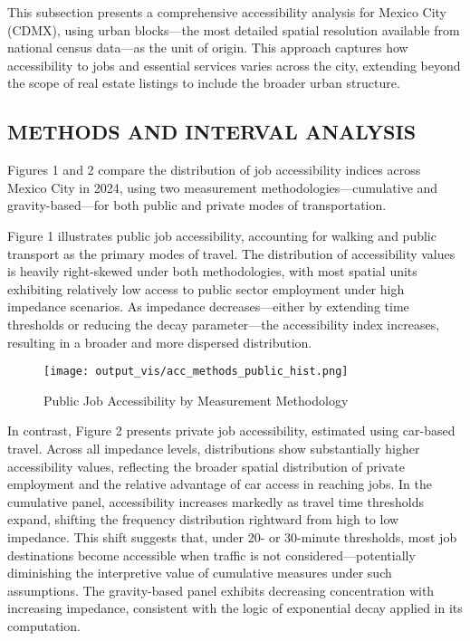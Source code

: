 \documentclass[
  12pt,
]{report}
\begin{document}
This subsection presents a comprehensive accessibility analysis for
Mexico City (CDMX), using urban blocks---the most detailed spatial
resolution available from national census data---as the unit of origin.
This approach captures how accessibility to jobs and essential services
varies across the city, extending beyond the scope of real estate
listings to include the broader urban structure.

\subsection{METHODS AND INTERVAL
ANALYSIS}\label{methods-and-interval-analysis}

Figures 1 and 2 compare the distribution of job accessibility indices
across Mexico City in 2024, using two measurement
methodologies---cumulative and gravity-based---for both public and
private modes of transportation.

Figure 1 illustrates public job accessibility, accounting for walking
and public transport as the primary modes of travel. The distribution of
accessibility values is heavily right-skewed under both methodologies,
with most spatial units exhibiting relatively low access to public
sector employment under high impedance scenarios. As impedance
decreases---either by extending time thresholds or reducing the decay
parameter---the accessibility index increases, resulting in a broader
and more dispersed distribution.

\begin{figure}[H]

{\centering \texttt{[image: output\_vis/acc\_methods\_public\_hist.png]}

}

\caption{Public Job Accessibility by Measurement Methodology}

\end{figure}%

In contrast, Figure 2 presents private job accessibility, estimated
using car-based travel. Across all impedance levels, distributions show
substantially higher accessibility values, reflecting the broader
spatial distribution of private employment and the relative advantage of
car access in reaching jobs. In the cumulative panel, accessibility
increases markedly as travel time thresholds expand, shifting the
frequency distribution rightward from high to low impedance. This shift
suggests that, under 20- or 30-minute thresholds, most job destinations
become accessible when traffic is not considered---potentially
diminishing the interpretive value of cumulative measures under such
assumptions. The gravity-based panel exhibits decreasing concentration
with increasing impedance, consistent with the logic of exponential
decay applied in its computation.
\end{document}
